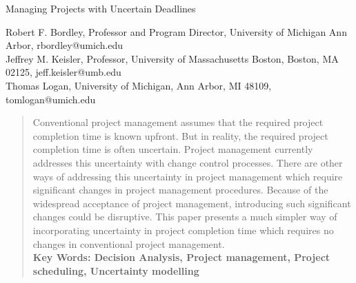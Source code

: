 \documentclass[11pt]{article}
\begin{document}
\begin{center} Managing Projects with Uncertain Deadlines
\end{center}
\begin{center}
Robert F. Bordley, Professor and Program Director, University of Michigan Ann Arbor, rbordley@umich.edu \\
Jeffrey M. Keisler, Professor, University of Massachusetts Boston, Boston, MA 02125, jeff.keisler@umb.edu \\
Thomas Logan, University of Michigan, Ann Arbor, MI 48109, tomlogan@umich.edu
\end{center}
\begin{abstract}
Conventional project management assumes that the required project completion time is known upfront.  But in reality, the required project completion time is often uncertain.  Project management currently addresses this uncertainty with change control processes.  There are other ways of addressing this uncertainty in project management which require significant changes in project management procedures.  Because of the widespread acceptance of project management, introducing such significant changes could be disruptive. This paper presents a much simpler way of incorporating uncertainty in project completion time which requires no changes in conventional project management. \\
\bf Key Words: \rm Decision Analysis, Project management, Project scheduling, Uncertainty modelling
\end{abstract}
\end{document}
